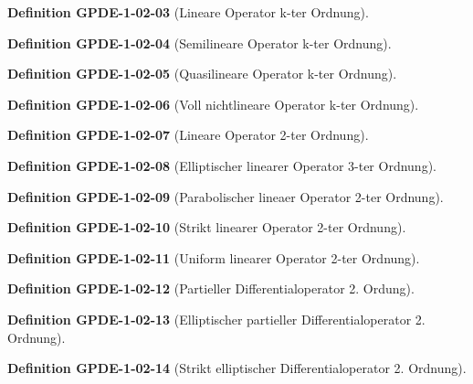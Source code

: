 \documentclass[10pt, letterpaper]{article}
\newcommand{\CustomHeading}[3]{%
  \par\medskip\noindent%
  \textbf{#1 #2} \textnormal{(#3)}.\enskip%
}
\newenvironment{DEF}[2]{\CustomHeading{Definition}{#1}{#2}}{}
\begin{document}
\begin{DEF}{GPDE-1-02-03}{Lineare Operator k-ter Ordnung}
\end{DEF}

\begin{DEF}{GPDE-1-02-04}{Semilineare Operator k-ter Ordnung}
\end{DEF}

\begin{DEF}{GPDE-1-02-05}{Quasilineare Operator k-ter Ordnung}
\end{DEF}

\begin{DEF}{GPDE-1-02-06}{Voll nichtlineare Operator k-ter Ordnung}
\end{DEF}

\begin{DEF}{GPDE-1-02-07}{Lineare Operator 2-ter Ordnung}
\end{DEF}

\begin{DEF}{GPDE-1-02-08}{Elliptischer linearer Operator 3-ter Ordnung}
\end{DEF}

\begin{DEF}{GPDE-1-02-09}{Parabolischer lineaer Operator 2-ter Ordnung}
\end{DEF}

\begin{DEF}{GPDE-1-02-10}{Strikt linearer Operator 2-ter Ordnung}
\end{DEF}

\begin{DEF}{GPDE-1-02-11}{Uniform linearer Operator 2-ter Ordnung}
\end{DEF}

\begin{DEF}{GPDE-1-02-12}{Partieller Differentialoperator 2. Ordung}
\end{DEF}

\begin{DEF}{GPDE-1-02-13}{Elliptischer partieller Differentialoperator 2. Ordnung}
\end{DEF}

\begin{DEF}{GPDE-1-02-14}{Strikt elliptischer Differentialoperator 2. Ordnung}
\end{DEF}
\end{document}
